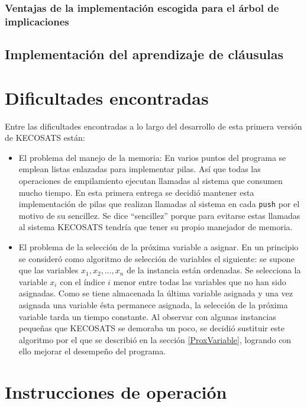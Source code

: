 \documentclass[12pt,lettersize,oneside]{article}
\begin{document}
\subsubsection{Ventajas de la implementación escogida para el árbol de implicaciones}


\subsection{Implementación del aprendizaje de cláusulas}
\newpage

\section{Dificultades encontradas}
Entre las dificultades encontradas a lo largo del desarrollo de esta primera
versión de KECOSATS están:
\begin{itemize}
\item El problema del manejo de la memoria: En varios puntos del programa se
  emplean listas enlazadas para implementar pilas. Así que todas las operaciones
  de empilamiento ejecutan llamadas al sistema que consumen mucho tiempo. En
  esta primera entrega se decidió mantener esta implementación de pilas que
  realizan llamadas al sistema en cada {\tt push} por el motivo de su
  sencillez. Se dice ``sencillez'' porque para evitarse estas llamadas al
  sistema KECOSATS tendría que tener su propio manejador de memoria.
\item El problema de la selección de la próxima variable a asignar. En un
  principio se consideró como algoritmo de selección de variables el siguiente:
  se supone que las variables $x_1,x_2,\ldots,x_n$ de la instancia están
  ordenadas. Se selecciona la variable $x_i$ con el índice $i$ menor entre todas
  las variables que no han sido asignadas. Como se tiene almacenada la última
  variable asignada y una vez asignada una variable ésta permanece asignada, la
  selección de la próxima variable tarda un tiempo constante. Al observar con
  algunas instancias pequeñas que KECOSATS se demoraba un poco, se decidió
  sustituir este algoritmo por el que se describió en la sección
  \ref{ProxVariable}, logrando con ello mejorar el desempeño del programa.
\end{itemize}

\section{Instrucciones de operación}
\end{document}
